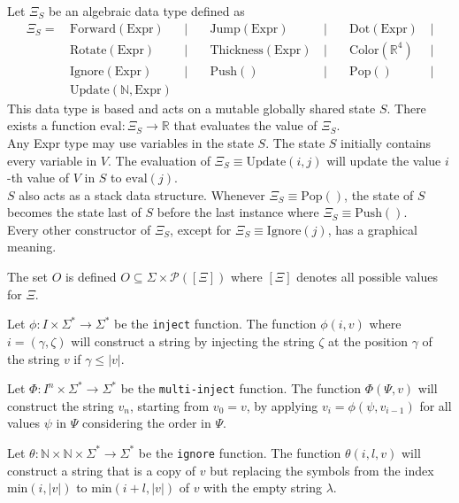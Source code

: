 \documentclass[a4paper]{article}
\begin{document}
Let \(\Xi_S\) be an algebraic data type defined as
\begin{align*}
    \Xi_S =\,
    &\text{Forward}(\text{Expr})\,&|\quad
    &\text{Jump}(\text{Expr})\,&|\quad
    &\text{Dot}(\text{Expr})\,&| \\
    &\text{Rotate}(\text{Expr})\,&|\quad
    &\text{Thickness}(\text{Expr})\,&|\quad
    &\text{Color}(\mathbb{R}^4)\,&| \\
    &\text{Ignore}(\text{Expr})\,&|\quad
    &\text{Push}()\,&|\quad
    &\text{Pop}()\,&| \\
    &\text{Update}(\mathbb{N}, \text{Expr})\,&
\end{align*}
This data type is based and acts on a mutable globally shared state \(S\).
There exists a function \(\text{eval} : \Xi_S \to \mathbb{R}\)
that evaluates the value of \(\Xi_S\). \\
Any Expr type may use variables in the state \(S\).
The state \(S\) initially contains every variable in \(V\).
The evaluation of \(\Xi_S \equiv \text{Update}(i, j)\)
will update the value \(i\)-th value of \(V\) in \(S\) to \(\text{eval}(j)\). \\
\(S\) also acts as a stack data structure. Whenever \(\Xi_S \equiv \text{Pop}()\),
the state of \(S\) becomes the state last of \(S\) before the last instance where
\(\Xi_S \equiv \text{Push}()\). \\
Every other constructor of \(\Xi_S\), except for \(\Xi_S \equiv \text{Ignore}(j)\),
has a graphical meaning.

The set \(O\) is defined \(O \subseteq \Sigma \times \mathcal{P}([\Xi])\)
where \([\Xi]\) denotes all possible values for \(\Xi\).


Let \(\phi : I \times \Sigma^* \to \Sigma^*\) be the \texttt{inject} function.
The function \(\phi(i, v)\) where \(i=(\gamma, \zeta)\)
will construct a string by injecting the string \(\zeta\)
at the position \(\gamma\) of the string \(v\) if \(\gamma \leq |v|\).

Let \(\Phi: I^n \times \Sigma^* \to \Sigma^*\)
be the \texttt{multi-inject} function.
The function \(\Phi(\Psi, v)\) will construct the string \(v_n\),
starting from \(v_0 = v\), by applying \(v_i = \phi(\psi, v_{i-1})\)
for all values \(\psi\) in \(\Psi\) considering the order in \(\Psi\).

Let \(\theta : \mathbb{N} \times \mathbb{N} \times \Sigma^* \to \Sigma^*\)
be the \texttt{ignore} function.
The function \(\theta(i, l, v)\) will construct a string that is a copy of \(v\)
but replacing the symbols from the index \(\text{min}(i, |v|)\) to
\(\text{min}(i+l, |v|)\) of \(v\) with the empty string \(\lambda\).
\end{document}
